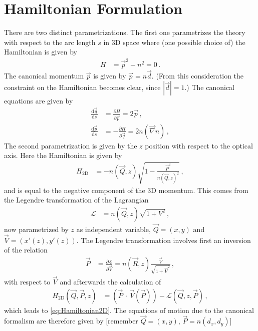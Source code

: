 \documentclass[12pt,a4paper,twoside,openright,BCOR10mm,headsepline,titlepage,abstracton,chapterprefix,final]{scrreprt}
\newcommand{\scpm}[2]{(#1\,\cdot\,#2)}
\begin{document}
\section{Hamiltonian Formulation}
There are two distinct parametrizations. The first one parametrizes the theory with respect to the
arc length $s$ in 3D space where (one possible choice of) the Hamiltonian is given by
\begin{align}
 H &= \vec{p}^2 - n^2 = 0\,.
\end{align}
The canonical momentum $\vec{p}$ is given by $\vec{p} = n \vec{d}$. (From this consideration the constraint on
the Hamiltonian becomes clear, since $|\vec{d}| = 1$.) The canonical equations are given by
\begin{subequations}
\label{eq:H3Deom}
\begin{align}
 \frac{\text{d}\vec{q}}{\text{d}s} &= \frac{\partial H}{\partial \vec{p}} = 2 \vec{p}\,,\\
 \frac{\text{d}\vec{p}}{\text{d}s} &= -\frac{\partial H}{\partial \vec{q}} = 2 n (\vec{\nabla} n)\,, 
\end{align}
\end{subequations}
The second parametrization is given by the $z$ position with respect to the optical axis. Here the Hamiltonian is
given by
\begin{align}
 H_{\text{2D}} &= -n(\vec{Q}, z)\sqrt{1 - \frac{\vec{P}^2}{n(\vec{Q}, z)^2}}\label{eq:Hamiltonian2D}\,,
\end{align}
and is equal to the negative component of the 3D momentum.
This comes from the Legendre transformation of the Lagrangian
\begin{align}
 \mathcal{L} &= n(\vec{Q}, z) \sqrt{1 + V^2}\,,
\end{align}
now parametrized by $z$ as independent variable, $\vec{Q} = (x,y)$ and $\vec{V} = (x'(z), y'(z))$.
The Legendre transformation involves first an inversion of the relation
\begin{align}
 \vec{P} &= \frac{\partial \mathcal{L}}{\partial \vec{V}} = n(\vec{R}, z) \frac{\vec{V}}{\sqrt{1 + \vec{V}^2}}\,,
\end{align}
with respect to $\vec{V}$ and afterwards the calculation of
\begin{align}
 H_{\text{2D}}(\vec{Q}, \vec{P},z) &= \scpm{\vec{P}}{\vec{V}(\vec{P})} - \mathcal{L}(\vec{Q}, z, \vec{P})\,,
\end{align}
which leads to \eqref{eq:Hamiltonian2D}. The equations of motion due to the canonical formalism 
are therefore given by [remember $\vec{Q} = (x,y)$, $\vec{P} = n (d_x, d_y)$]
\end{document}
